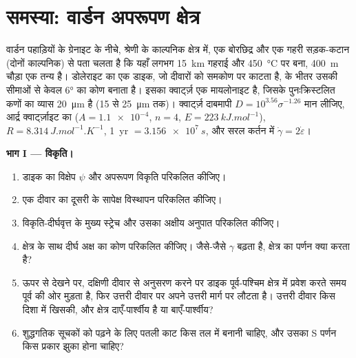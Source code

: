 \section{समस्या: वार्डन अपरूपण क्षेत्र}

\begin{problem}
\label{pb:b3:deformation-mechanisms:1}
वार्डन पहाड़ियों के ग्रेनाइट के नीचे, श्रेणी के काल्पनिक क्षेत्र में, एक
बोरछिद्र और एक गहरी सड़क-कटान (दोनों काल्पनिक) से पता चलता है कि
यहाँ लगभग \qty{15}{km} गहराई और \qty{450}{\celsius} पर बना, \qty{400}{m} चौड़ा एक तन्य  है।
डोलेराइट का एक डाइक, जो दीवारों को समकोण पर काटता है,  के भीतर
उसकी सीमाओं से केवल \ang{6} का कोण बनाता है। इसका क्वार्ट्ज़ एक मायलोनाइट है,
जिसके पुनःक्रिस्टलित कणों का व्यास \qty{20}{\micro m} है (15 से
\qty{25}{\micro m} तक)। क्वार्ट्ज़ दाबमापी $D = 10^{3.56}\sigma^{-1.26}$ मान लीजिए,
आर्द्र क्वार्ट्ज़ाइट का  ($A = \num{1.1e-4}$, $n = 4$, $E =
\qty{223}{kJ.mol^{-1}}$), $R = \qty{8.314}{J.mol^{-1}.K^{-1}}$, \qty{1}{yr} $=
\qty{3.156e7}{s}$, और सरल कर्तन में $\dot\gamma = 2\dot\varepsilon$।

\medskip\noindent\textbf{भाग I --- विकृति।}
\begin{enumerate}
  \item डाइक का विक्षेप $\psi$ और अपरूपण विकृति परिकलित कीजिए।
  \item एक दीवार का दूसरी के सापेक्ष विस्थापन परिकलित कीजिए।
  \item विकृति-दीर्घवृत्त के मुख्य स्ट्रेच और उसका अक्षीय
        अनुपात परिकलित कीजिए।
  \item क्षेत्र के साथ दीर्घ अक्ष का कोण परिकलित कीजिए।
        जैसे-जैसे $\gamma$ बढ़ता है, क्षेत्र का पर्णन क्या करता है?
  \item ऊपर से देखने पर, दक्षिणी दीवार से अनुसरण करने पर डाइक
        पूर्व-पश्चिम क्षेत्र में प्रवेश करते समय पूर्व की ओर मुड़ता है, फिर
        उत्तरी दीवार पर अपने उत्तरी मार्ग पर लौटता है। उत्तरी दीवार किस दिशा में
        खिसकी, और क्षेत्र दाएँ-पार्श्वीय है या बाएँ-पार्श्वीय?
  \item शुद्धगतिक सूचकों को पढ़ने के लिए पतली काट किस तल में बनानी चाहिए,
        और उसका S पर्णन किस प्रकार झुका होना चाहिए?
\end{enumerate}


\end{problem}
